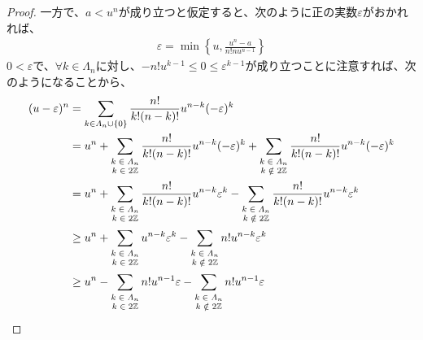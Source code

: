\documentclass[dvipdfmx]{jsarticle}
\begin{document}
\begin{proof}
一方で、$a < u^{n}$が成り立つと仮定すると、次のように正の実数$\varepsilon$がおかれれば、
\begin{align*}
\varepsilon = \min\left\{ u,\frac{u^{n} - a}{n!nu^{n - 1}} \right\}
\end{align*}
$0 < \varepsilon$で、$\forall k \in \varLambda_{n}$に対し、$- n!u^{k - 1} \leq 0 \leq \varepsilon^{k - 1}$が成り立つことに注意すれば、次のようになることから、
\begin{align*}
(u - \varepsilon)^{n} &= \sum_{k \in \varLambda_{n} \cup \left\{ 0 \right\}} {\frac{n!}{k!(n - k)!}u^{n - k}( - \varepsilon)^{k}}\\ 
&= u^{n} + \sum_{\scriptsize \begin{matrix} k \in \varLambda_{n} \\ k \in 2\mathbb{Z} \end{matrix}} {\frac{n!}{k!(n - k)!}u^{n - k}( - \varepsilon)^{k}} + \sum_{\scriptsize \begin{matrix} k \in \varLambda_{n} \\ k \notin 2\mathbb{Z} \end{matrix}} {\frac{n!}{k!(n - k)!}u^{n - k}( - \varepsilon)^{k}}\\ 
&= u^{n} + \sum_{\scriptsize \begin{matrix} k \in \varLambda_{n} \\ k \in 2\mathbb{Z} \end{matrix}} {\frac{n!}{k!(n - k)!}u^{n - k}\varepsilon^{k}} - \sum_{\scriptsize \begin{matrix} k \in \varLambda_{n} \\ k \notin 2\mathbb{Z} \end{matrix}} {\frac{n!}{k!(n - k)!}u^{n - k}\varepsilon^{k}}\\ 
&\geq u^{n} + \sum_{\scriptsize \begin{matrix} k \in \varLambda_{n} \\ k \in 2\mathbb{Z} \end{matrix}} {u^{n - k}\varepsilon^{k}} - \sum_{\scriptsize \begin{matrix} k \in \varLambda_{n} \\ k \notin 2\mathbb{Z} \end{matrix}} {n!u^{n - k}\varepsilon^{k}}\\ 
&\geq u^{n} - \sum_{\scriptsize \begin{matrix} k \in \varLambda_{n} \\ k \in 2\mathbb{Z} \end{matrix}} {n!u^{n - 1}\varepsilon} - \sum_{\scriptsize \begin{matrix} k \in \varLambda_{n} \\ k \notin 2\mathbb{Z} \end{matrix}} {n!u^{n - 1}\varepsilon}\\ 

\end{align*}
\end{proof}
\end{document}
